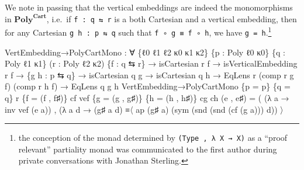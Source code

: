 \documentclass[
  11pt,
  oneside,
  article]{memoir}
\newenvironment{Shaded}{}{}
\newcommand{\NormalTok}[1]{#1}
\newcommand{\OtherTok}[1]{\textcolor[rgb]{0.00,0.44,0.13}{#1}}
\theoremstyle{definition}
\theoremstyle{plain}
\newcommand{\Cat}[1]{\mathbf{#1}}%
\newcommand{\poly}{\Cat{Poly}}
\newcommand{\0}{\textsf{0}}
\newcommand{\1}{\tn{\textsf{1}}}
\begin{document}
We note in passing that the vertical embeddings are indeed the
monomorphisms in \(\poly^{\mathbf{Cart}}\), i.e.~if
\texttt{f\ :\ q\ ⇆\ r} is a both Cartesian and a vertical embedding,
then for any Cartesian \texttt{g\ h\ :\ p\ ⇆\ q} such that
\texttt{f\ ∘\ g\ ≡\ f\ ∘\ h}, we have \texttt{g\ =\ h}.\footnote{the
  conception of the monad determined by \texttt{(Type\ ,\ λ\ X\ →\ X)}
  as a ``proof relevant'' partiality monad was communicated to the first
  author during private conversations with Jonathan Sterling.}

\begin{Shaded}
\begin{Highlighting}[]
\NormalTok{VertEmbedding→PolyCartMono }\OtherTok{:} \OtherTok{∀} \OtherTok{\{}\NormalTok{ℓ0 ℓ1 ℓ2 κ0 κ1 κ2}\OtherTok{\}} \OtherTok{\{}\NormalTok{p }\OtherTok{:}\NormalTok{ Poly ℓ0 κ0}\OtherTok{\}}
                             \OtherTok{\{}\NormalTok{q }\OtherTok{:}\NormalTok{ Poly ℓ1 κ1}\OtherTok{\}} \OtherTok{(}\NormalTok{r }\OtherTok{:}\NormalTok{ Poly ℓ2 κ2}\OtherTok{)} \OtherTok{\{}\NormalTok{f }\OtherTok{:}\NormalTok{ q ⇆ r}\OtherTok{\}}
                             \OtherTok{→}\NormalTok{ isCartesian r f }\OtherTok{→}\NormalTok{ isVerticalEmbedding r f}
                             \OtherTok{→} \OtherTok{\{}\NormalTok{g h }\OtherTok{:}\NormalTok{ p ⇆ q}\OtherTok{\}} \OtherTok{→}\NormalTok{ isCartesian q g }\OtherTok{→}\NormalTok{ isCartesian q h}
                             \OtherTok{→}\NormalTok{ EqLens r }\OtherTok{(}\NormalTok{comp r g f}\OtherTok{)} \OtherTok{(}\NormalTok{comp r h f}\OtherTok{)}
                             \OtherTok{→}\NormalTok{ EqLens q g h}
\NormalTok{VertEmbedding→PolyCartMono }\OtherTok{\{}\NormalTok{p }\OtherTok{=}\NormalTok{ p}\OtherTok{\}} \OtherTok{\{}\NormalTok{q }\OtherTok{=}\NormalTok{ q}\OtherTok{\}}\NormalTok{ r }\OtherTok{\{}\NormalTok{f }\OtherTok{=} \OtherTok{(}\NormalTok{f , f♯}\OtherTok{)\}}\NormalTok{ cf vef }
                           \OtherTok{\{}\NormalTok{g }\OtherTok{=} \OtherTok{(}\NormalTok{g , g♯}\OtherTok{)\}} \OtherTok{\{}\NormalTok{h }\OtherTok{=} \OtherTok{(}\NormalTok{h , h♯}\OtherTok{)\}}\NormalTok{ cg ch }\OtherTok{(}\NormalTok{e , e♯}\OtherTok{)} \OtherTok{=} 
    \OtherTok{(} \OtherTok{(λ}\NormalTok{ a }\OtherTok{→}\NormalTok{ inv vef }\OtherTok{(}\NormalTok{e a}\OtherTok{))} 
\NormalTok{    , }\OtherTok{(λ}\NormalTok{ a d }\OtherTok{→} \OtherTok{(}\NormalTok{g♯ a d}\OtherTok{)} 
\NormalTok{                   ≡〈 ap }\OtherTok{(}\NormalTok{g♯ a}\OtherTok{)} \OtherTok{(}\NormalTok{sym }\OtherTok{(}\NormalTok{snd }\OtherTok{(}\NormalTok{snd }\OtherTok{(}\NormalTok{cf }\OtherTok{(}\NormalTok{g a}\OtherTok{)))}\NormalTok{ d}\OtherTok{))}\NormalTok{ 〉 }

\end{Highlighting}
\end{Shaded}
\end{document}
